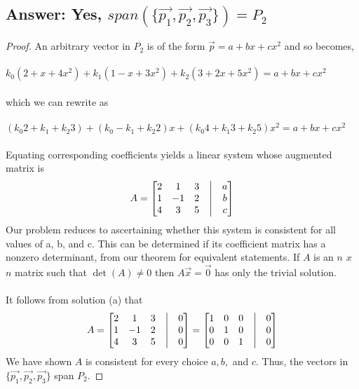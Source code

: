 \documentclass[11pt]{article}
\begin{document}
\subsection{Answer: Yes, $span(\{\vec{p_{1}},\vec{p_{2}},\vec{p_{3}}\}) = P_{2}$}
\begin{proof}
        An arbitrary vector in $P_{2}$ is of the form $\vec{p}=a+bx+cx^2$ and so becomes,\\\\
        $k_{0}(2 + x + 4x^2) +  k_{1}(1 - x + 3x^2) + k_{2}(3 + 2x + 5x^2) = a+bx+cx^2$\\\\
        which we can rewrite as \\\\
        $(k_{0}2 + k_{1} + k_{2}3) + (k_{0} - k_{1} + k_{2}2)x + (k_{0}4 + k_{1}3 + k_{2}5)x^2 = a+bx+cx^2$\\\\
        Equating corresponding coefficients yields a linear system whose augmented matrix is
        \begin{align*}
                A =
                \begin{bmatrix}
                        2 & 1  & 3 & \bigm| & a \\
                        1 & -1 & 2 & \bigm| & b \\
                        4 & 3  & 5 & \bigm| & c \\
                \end{bmatrix}
        \end{align*}
        Our problem reduces to ascertaining whether this system is consistent for
        all values of a, b, and c. This can be determined if its coefficient matrix
        has a nonzero determinant, from our theorem for equivalent statements.
        If $A$ is an $n$ $x$ $n$ matrix such that $\det(A)\neq0$ then $A\vec{x}=\vec{0}$ has only the trivial solution.\\\\
        It follows from solution (a) that
        \begin{align*}
                A =
                \begin{bmatrix}
                        2 & 1  & 3 & \bigm| & 0 \\
                        1 & -1 & 2 & \bigm| & 0 \\
                        4 & 3  & 5 & \bigm| & 0 \\
                \end{bmatrix}
                =
                \begin{bmatrix}
                        1 & 0 & 0 & \bigm| & 0 \\
                        0 & 1 & 0 & \bigm| & 0 \\
                        0 & 0 & 1 & \bigm| & 0 \\
                \end{bmatrix}
        \end{align*}
        We have shown $A$ is consistent for every choice $a,b,$ and $c$.
        Thus, the vectors in $\{\vec{p_{1}},\vec{p_{2}},\vec{p_{3}}\}$ span $P_{2}$.
\end{proof}
\end{document}
